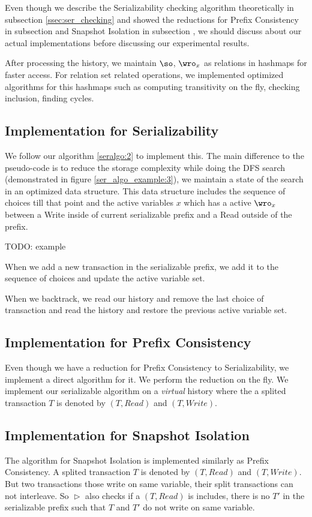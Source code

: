 

Even though we describe the Serializability checking algorithm theoretically in subsection \ref{ssec:ser_checking} and showed the reductions for Prefix Consistency in subsection \label{ssec:pc} and Snapshot Isolation in subsection \label{ssec:si}, we should discuss about our actual implementations before discussing our experimental results.

After processing the history, we maintain $\so$, $\wro_{x}$ as relations in hashmaps for faster access. For relation set related operations, we implemented optimized algorithms for this hashmaps such as computing transitivity on the fly, checking inclusion, finding cycles. 

\subsection{Implementation for Serializability}\label{ssec:imp-ser}
We follow our algorithm \ref{seralgo:2} to implement this. The main difference to the pseudo-code is to reduce the storage complexity while doing the DFS search (demonstrated in figure \ref{ser_algo_example:3}), we maintain a state of the search in an optimized data structure. This data structure includes the sequence of choices till that point and the active variables $x$ which has a active $\wro_{x}$ between a \textsf{Write} inside of current serializable prefix and a \textsf{Read} outside of the prefix.

TODO: example

When we add a new transaction in the serializable prefix, we add it to the sequence of choices and update the active variable set.

When we backtrack, we read our history and remove the last choice of transaction and read the history and restore the previous active variable set.


\subsection{Implementation for Prefix Consistency}\label{ssec:imp-pc}

Even though we have a reduction for Prefix Consistency to Serializability, we implement a direct algorithm for it. We perform the reduction on the fly. We implement our serializable algorithm on a \emph{virtual} history where the a splited transaction $T$ is denoted by $(T, Read)$ and $(T, Write)$. 

\subsection{Implementation for Snapshot Isolation}\label{ssec:imp-si}

The algorithm for Snapshot Isolation is implemented similarly as Prefix Consistency. A splited transaction $T$ is denoted by $(T, Read)$ and $(T, Write)$. But two transactions those write on same variable, their split transactions can not interleave. So $\vartriangleright$ also checks if a $(T, Read)$ is includes, there is no $T'$ in the serializable prefix such that $T$ and $T'$ do not write on same variable.
